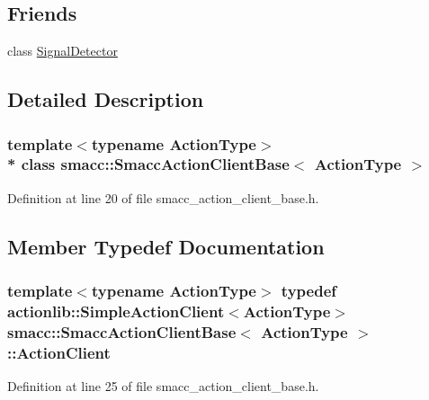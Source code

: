 \subsection*{Friends}
\begin{DoxyCompactItemize}
\item 
class \hyperlink{classsmacc_1_1SmaccActionClientBase_a9fb9044f83e768849d1b42d9d0d5508e}{Signal\+Detector}
\end{DoxyCompactItemize}


\subsection{Detailed Description}
\subsubsection*{template$<$typename Action\+Type$>$\\*
class smacc\+::\+Smacc\+Action\+Client\+Base$<$ Action\+Type $>$}



Definition at line 20 of file smacc\+\_\+action\+\_\+client\+\_\+base.\+h.



\subsection{Member Typedef Documentation}
\subsubsection[{\texorpdfstring{Action\+Client}{ActionClient}}]{\setlength{\rightskip}{0pt plus 5cm}template$<$typename Action\+Type$>$ typedef actionlib\+::\+Simple\+Action\+Client$<$Action\+Type$>$ {\bf smacc\+::\+Smacc\+Action\+Client\+Base}$<$ Action\+Type $>$\+::{\bf Action\+Client}}\hypertarget{classsmacc_1_1SmaccActionClientBase_aea1392d9e41f48bda1de8acaec1c3233}{}\label{classsmacc_1_1SmaccActionClientBase_aea1392d9e41f48bda1de8acaec1c3233}


Definition at line 25 of file smacc\+\_\+action\+\_\+client\+\_\+base.\+h.

